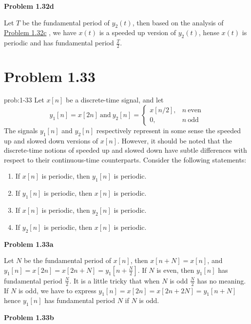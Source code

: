 \documentclass[koma,a4paper,utopia,12pt,listings-color,microtype,paralist,colorlinks,urlcolor=red]{org-article}
\begin{document}
\textbf{Problem 1.32d}

Let \(T\) be the fundamental period of \(y_{2}(t)\), then based on the analysis
of \hyperref[Problem 1.32c]{Problem 1.32c} , we have \(x(t)\) is a speeded up version of \(y_{2}(t)\),
hense \(x(t)\) is periodic and has fundamental period \(\frac{T}{2}\).
\section{Problem 1.33}
\label{sec:orgc6b726e}


\begin{prob}[]{prob:1-33}
Let \(x[n]\) be a discrete-time signal, and let
\begin{equation*}
y_{1}[n] = x[2n] \ \mathrm{and}\ y_{2}[n] =
\begin{cases}
x[n/2], & n\ \mathrm{even} \\
0, & n\ \mathrm{odd}
\end{cases}
\end{equation*}
The signals \(y_{1}[n]\) and \(y_{2}[n]\) respectively represent in some
sense the speeded  up and slowed down versions of \(x[n]\). However, it
should be noted that the discrete-time notions of speeded up and slowed down
have subtle differences with respect to their continuous-time counterparts.
Consider the following statements:

\begin{enumerate}
\item If \(x[n]\) is periodic, then \(y_{1}[n]\) is periodic.
\item If \(y_{1}[n]\) is periodic, then \(x[n]\) is periodic.
\item If \(x[n]\) is periodic, then \(y_{2}[n]\) is periodic.
\item If \(y_{2}[n]\) is periodic, then \(x[n]\) is periodic.
\end{enumerate}
\label{prob:1-33}
\end{prob}

\textbf{Problem 1.33a}

Let \(N\) be the fundamental period of \(x[n]\), then \(x[n+N] = x[n]\), and
\(y_{1}[n] = x[2n] = x[2n+N] = y_{1}[n+ \frac{N}{2}]\). If \(N\) is even, then
\(y_{1}[n]\) has fundamental period \(\frac{N}{2}\).  It is a little tricky
that when \(N\) is odd \(\frac{N}{2}\) has no meaning. If \(N\) is odd, we have
to express \(y_{1}[n] = x[2n] = x[2n+2N] = y_{1}[n+ N]\) hence \(y_{1}[n]\) has
fundamental period \(N\) if \(N\) is odd.

\textbf{Problem 1.33b}
\end{document}
